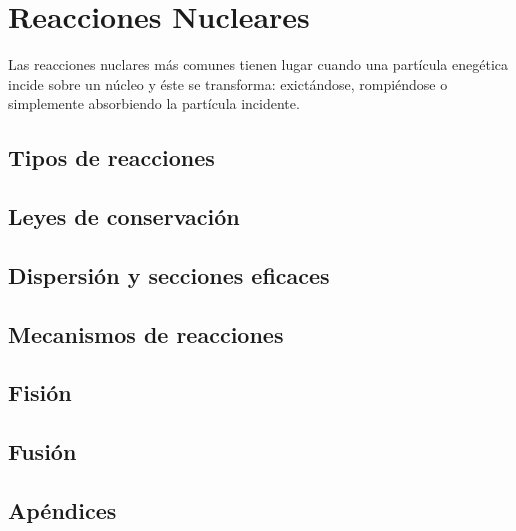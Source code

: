 \chapter{Reacciones Nucleares}

Las reacciones nuclares más comunes tienen lugar cuando una partícula enegética incide sobre un núcleo y éste se transforma: exictándose, rompiéndose o simplemente absorbiendo la partícula incidente.

\section{Tipos de reacciones}

\section{Leyes de conservación}

\section{Dispersión y secciones eficaces}

\section{Mecanismos de reacciones}

\section{Fisión}

\section{Fusión}

\section{Apéndices}